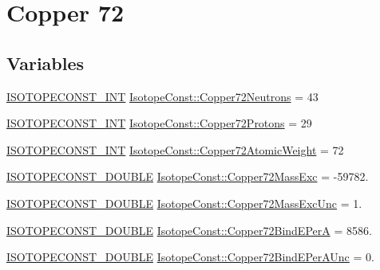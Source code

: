 \hypertarget{group___isotope_const-_copper-_cu72}{}\section{Copper 72}
\label{group___isotope_const-_copper-_cu72}
\subsection*{Variables}
\begin{DoxyCompactItemize}
\item 
\mbox{\hyperlink{group___isotope_const-_macros_ga5f18360b3e99483a35c32d789e62621c}{I\+S\+O\+T\+O\+P\+E\+C\+O\+N\+S\+T\+\_\+\+I\+NT}} \mbox{\hyperlink{group___isotope_const-_copper-_cu72_ga20682f81cb9f926d06dced792a99e595}{Isotope\+Const\+::\+Copper72\+Neutrons}} = 43
\item 
\mbox{\hyperlink{group___isotope_const-_macros_ga5f18360b3e99483a35c32d789e62621c}{I\+S\+O\+T\+O\+P\+E\+C\+O\+N\+S\+T\+\_\+\+I\+NT}} \mbox{\hyperlink{group___isotope_const-_copper-_cu72_ga0ef0a13d765d040a36672568ff54bbf2}{Isotope\+Const\+::\+Copper72\+Protons}} = 29
\item 
\mbox{\hyperlink{group___isotope_const-_macros_ga5f18360b3e99483a35c32d789e62621c}{I\+S\+O\+T\+O\+P\+E\+C\+O\+N\+S\+T\+\_\+\+I\+NT}} \mbox{\hyperlink{group___isotope_const-_copper-_cu72_ga8475b4b316e0f644f5486397279ed066}{Isotope\+Const\+::\+Copper72\+Atomic\+Weight}} = 72
\item 
\mbox{\hyperlink{group___isotope_const-_macros_ga8f45a7272ce02c0b4c65c44636ed719a}{I\+S\+O\+T\+O\+P\+E\+C\+O\+N\+S\+T\+\_\+\+D\+O\+U\+B\+LE}} \mbox{\hyperlink{group___isotope_const-_copper-_cu72_ga1d7240590b2742e30d0fa8208637a7be}{Isotope\+Const\+::\+Copper72\+Mass\+Exc}} = -\/59782.
\item 
\mbox{\hyperlink{group___isotope_const-_macros_ga8f45a7272ce02c0b4c65c44636ed719a}{I\+S\+O\+T\+O\+P\+E\+C\+O\+N\+S\+T\+\_\+\+D\+O\+U\+B\+LE}} \mbox{\hyperlink{group___isotope_const-_copper-_cu72_gac3a305d2342e08eef132b5679e3ff0e5}{Isotope\+Const\+::\+Copper72\+Mass\+Exc\+Unc}} = 1.
\item 
\mbox{\hyperlink{group___isotope_const-_macros_ga8f45a7272ce02c0b4c65c44636ed719a}{I\+S\+O\+T\+O\+P\+E\+C\+O\+N\+S\+T\+\_\+\+D\+O\+U\+B\+LE}} \mbox{\hyperlink{group___isotope_const-_copper-_cu72_ga2d681ca70d3624ccd82544d66108ddb8}{Isotope\+Const\+::\+Copper72\+Bind\+E\+PerA}} = 8586.
\item 
\mbox{\hyperlink{group___isotope_const-_macros_ga8f45a7272ce02c0b4c65c44636ed719a}{I\+S\+O\+T\+O\+P\+E\+C\+O\+N\+S\+T\+\_\+\+D\+O\+U\+B\+LE}} \mbox{\hyperlink{group___isotope_const-_copper-_cu72_ga82597aca7364671a70ecab1f4a7dcb3f}{Isotope\+Const\+::\+Copper72\+Bind\+E\+Per\+A\+Unc}} = 0.

\end{DoxyCompactItemize}
